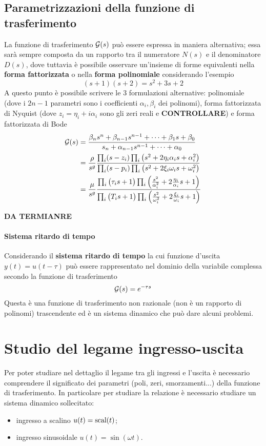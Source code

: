 	\subsection{Parametrizzazioni della funzione di trasferimento}
		La funzione di trasferimento $\mathcal G(s)$ può essere espressa in maniera alternativa; essa sarà sempre composta da un rapporto tra il numeratore $N(s)$ e il denominatore $D(s)$, dove tuttavia è possibile osservare un'insieme di forme equivalenti nella \textbf{forma fattorizzata} o nella \textbf{forma polinomiale} considerando l'esempio
		\[ (s+1)(s+2) = s^2 + 3s + 2\]
		A questo punto è possibile scrivere le 3 formulazioni alternative: polinomiale (dove i $2n-1$ parametri sono i coefficienti $\alpha_i,\beta_i$ dei polinomi), forma fattorizzata di Nyquist (dove $z_i = \eta_i +i\alpha_i$ sono gli zeri reali e \textbf{CONTROLLARE}) e forma fattorizzata di Bode
		\begin{align*}
			\mathcal G(s) & = \frac{\beta_n s^n + \beta_{n-1}s^{n-1} + \dots + \beta_1 s + \beta_0}{s_n + \alpha_{n-1}s^{n-1} + \dots + \alpha_0}
		 \\
			& = \frac{\rho}{s^g} \frac{\prod_i (s-z_i) \prod_i \big(
				s^2 +2\eta_i\alpha_i s + \alpha_i^2\big)}{\prod_i (s-p_i) \prod_i \big(
				s^2 +2\xi_i\omega_i s + \omega_i^2\big)} \\		& = \frac \mu {s^g} \frac{\prod_i \big( \tau_i s + 1 \big) \prod_i \left(\frac{s^2}{\alpha_i^2}  + 2\frac {\eta_i}{\alpha_i} s + 1 	\right) }{ \prod_i \big( T_i s + 1 \big) \prod_i \left(\frac{s^2}{\omega_i^2}  + 2\frac {\xi_i}{\omega_i} s + 1 \right) }				
		\end{align*}
		
		\textbf{DA TERMIANRE}
		
		\paragraph{Sistema ritardo di tempo} Considerando il \textbf{sistema ritardo di tempo} la cui funzione d'uscita $y(t)=u(t-\tau)$ può essere rappresentato nel dominio della variabile complessa secondo la funzione di trasferimento
		\[ \mathcal G(s) = e^{-\tau s} \]		
		Questa è una funzione di trasferimento non razionale (non è un rapporto di polinomi) trascendente ed è un sistema dinamico che può dare alcuni problemi.
		
		
\section{Studio del legame ingresso-uscita}
	Per poter studiare nel dettaglio il legame tra gli ingressi e l'uscita è necessario comprendere il significato dei parametri (poli, zeri, smorzamenti...) della funzione di trasferimento. In particolare per studiare la relazione è necessario studiare un sistema dinamico sollecitato:
	\begin{itemize}
		\item ingresso a scalino $u(t) = \textrm{scal} (t)$;
		\item ingresso sinusoidale $u(t)  = \sin(\omega t)$.
	\end{itemize}

